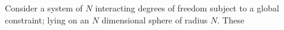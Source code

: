 Consider a system of $N$ interacting degrees of freedom subject to a global constraint; lying on an $N$ dimensional sphere of radius $N$. These 